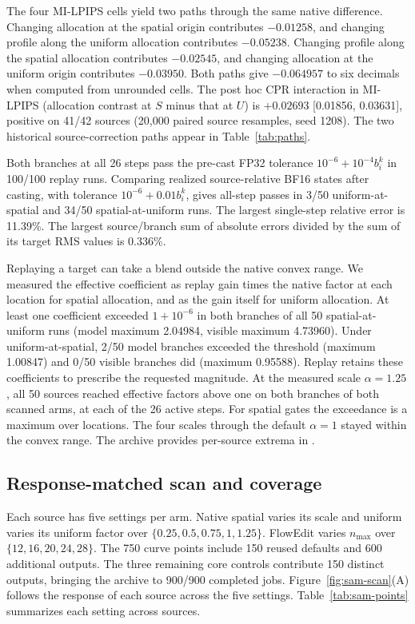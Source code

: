 The four MI-LPIPS cells yield two paths through the same native difference. Changing allocation at the spatial origin contributes $-0.01258$, and changing profile along the uniform allocation contributes $-0.05238$. Changing profile along the spatial allocation contributes $-0.02545$, and changing allocation at the uniform origin contributes $-0.03950$. Both paths give $-0.064957$ to six decimals when computed from unrounded cells. The post hoc CPR interaction in MI-LPIPS (allocation contrast at $S$ minus that at $U$) is $+0.02693$ [0.01856, 0.03631], positive on 41/42 sources (20,000 paired source resamples, seed 1208). The two historical source-correction paths appear in Table~\ref{tab:paths}.

Both branches at all 26 steps pass the pre-cast FP32 tolerance $10^{-6}+10^{-4}b_i^k$ in 100/100 replay runs. Comparing realized source-relative BF16 states after casting, with tolerance $10^{-6}+0.01b_i^k$, gives all-step passes in 3/50 uniform-at-spatial and 34/50 spatial-at-uniform runs. The largest single-step relative error is 11.39\%. The largest source/branch sum of absolute errors divided by the sum of its target RMS values is 0.336\%.

Replaying a target can take a blend outside the native convex range. We measured the effective coefficient as replay gain times the native factor at each location for spatial allocation, and as the gain itself for uniform allocation. At least one coefficient exceeded $1+10^{-6}$ in both branches of all 50 spatial-at-uniform runs (model maximum 2.04984, visible maximum 4.73960). Under uniform-at-spatial, 2/50 model branches exceeded the threshold (maximum 1.00847) and 0/50 visible branches did (maximum 0.95588). Replay retains these coefficients to prescribe the requested magnitude. At the measured scale $\alpha=1.25$, all 50 sources reached effective factors above one on both branches of both scanned arms, at each of the 26 active steps. For spatial gates the exceedance is a maximum over locations. The four scales through the default $\alpha=1$ stayed within the convex range. The archive provides per-source extrema in .

\subsection{Response-matched scan and coverage}
\label{sec:sam-scan}
Each source has five settings per arm. Native spatial varies its scale and uniform varies its uniform factor over $\{0.25,0.5,0.75,1,1.25\}$. FlowEdit varies $n_{\max}$ over $\{12,16,20,24,28\}$. The 750 curve points include 150 reused defaults and 600 additional outputs. The three remaining core controls contribute 150 distinct outputs, bringing the archive to 900/900 completed jobs. Figure~\ref{fig:sam-scan}(A) follows the response of each source across the five settings. Table~\ref{tab:sam-points} summarizes each setting across sources.

